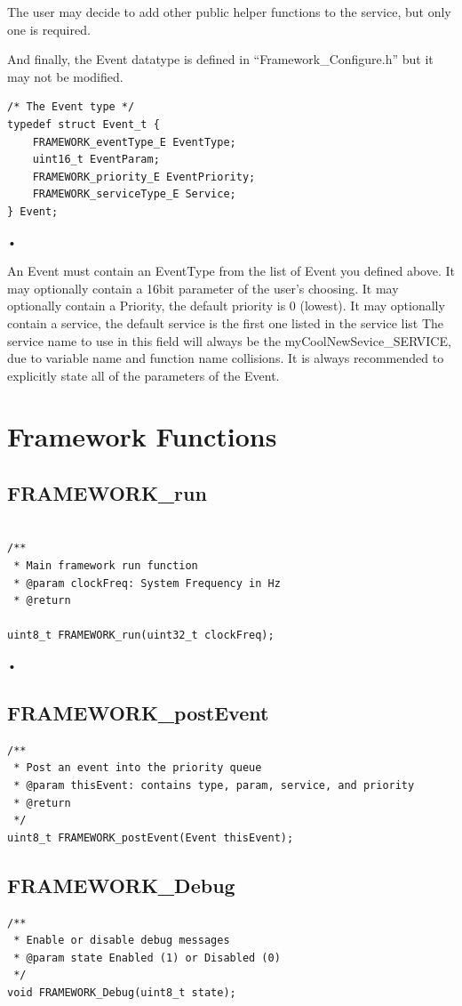 \documentclass[12pt compsoc]{article}
\begin{document}
The user may decide to add other public helper functions to the service, but only one is required.

And finally, the Event datatype is defined in ``Framework\_Configure.h'' but it may not be modified.

\begin{verbatim}
/* The Event type */
typedef struct Event_t {
    FRAMEWORK_eventType_E EventType;
    uint16_t EventParam;
    FRAMEWORK_priority_E EventPriority;
    FRAMEWORK_serviceType_E Service;
} Event;
\end{verbatim}•

An Event must contain an EventType from the list of Event you defined above. It may optionally contain a 16bit parameter of the user's choosing. It may optionally contain a Priority, the default priority is 0 (lowest). It may optionally contain a service, the default service is the first one listed in the service list The service name to use in this field will always be the myCoolNewSevice\_SERVICE, due to variable name and function name collisions. It is always recommended to explicitly state all of the parameters of the Event.

\section{Framework Functions}

\subsection{FRAMEWORK\_run}
\begin{verbatim}

/**
 * Main framework run function
 * @param clockFreq: System Frequency in Hz
 * @return 

uint8_t FRAMEWORK_run(uint32_t clockFreq);
\end{verbatim}•


\subsection{FRAMEWORK\_postEvent}
\begin{verbatim}
/**
 * Post an event into the priority queue
 * @param thisEvent: contains type, param, service, and priority
 * @return 
 */
uint8_t FRAMEWORK_postEvent(Event thisEvent);
\end{verbatim}

\subsection{FRAMEWORK\_Debug}
\begin{verbatim}
/**
 * Enable or disable debug messages
 * @param state Enabled (1) or Disabled (0)
 */
void FRAMEWORK_Debug(uint8_t state);
\end{verbatim}
\end{document}
